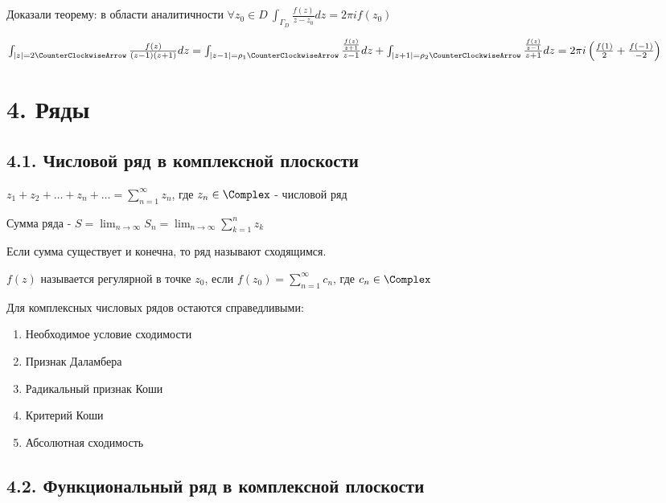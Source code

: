 \documentclass[12pt]{article}
\begin{document}
\Nota Доказали теорему: в области аналитичности $\forall z_0 \in D \ \int_{\Gamma_D} \frac{f(z)}{z - z_0} dz = 2 \pi i f(z_0)$

\Ex $\int_{|z| = 2 \CounterClockwiseArrow} \frac{f(z)}{(z - 1)(z + 1)} dz = \int_{|z - 1| = \rho_1 \CounterClockwiseArrow} \frac{\frac{f(z)}{z + 1}}{z - 1} dz + \int_{|z + 1| = \rho_2 \CounterClockwiseArrow} \frac{\frac{f(z)}{z - 1}}{z + 1} dz = 
2\pi i \left(\frac{f(1)}{2} + \frac{f(-1)}{-2}\right)$








\section{4. Ряды}

\subsection{4.1. Числовой ряд в комплексной плоскости}

 $z_1 + z_2 + \dots + z_n + \dots = \sum_{n = 1}^\infty z_n$, где $z_n \in \Complex$ - числовой ряд

 Сумма ряда - $S = \lim_{n \to \infty} S_n = \lim_{n \to \infty} \sum_{k = 1}^n z_k$

Если сумма существует и конечна, то ряд называют сходящимся. 

\Def $f(z)$ называется регулярной в точке $z_0$, если $f(z_0) = \sum_{n = 1}^\infty c_n$, где $c_n \in \Complex$

\Nota Для комплексных числовых рядов остаются справедливыми:

\begin{enumerate}
    \item Необходимое условие сходимости
    \item Признак Даламбера
    \item Радикальный признак Коши
    \item Критерий Коши
    \item Абсолютная сходимость
\end{enumerate}

\subsection{4.2. Функциональный ряд в комплексной плоскости}
\end{document}
